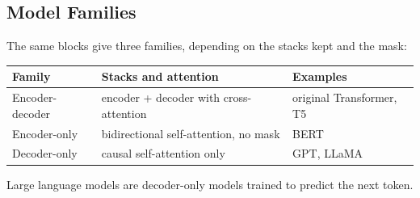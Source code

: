 \subsection{Model Families}
The same blocks give three families, depending on the stacks kept and the mask:
\begin{center}
\begin{tabular}{|l|l|l|}
    \hline
    Family & Stacks and attention & Examples\\
    \hline
    Encoder-decoder & encoder + decoder with cross-attention & original Transformer, T5\\
    Encoder-only & bidirectional self-attention, no mask & BERT\\
    Decoder-only & causal self-attention only & GPT, LLaMA\\
    \hline
\end{tabular}
\end{center}
Large language models are decoder-only models trained to predict the next token.
